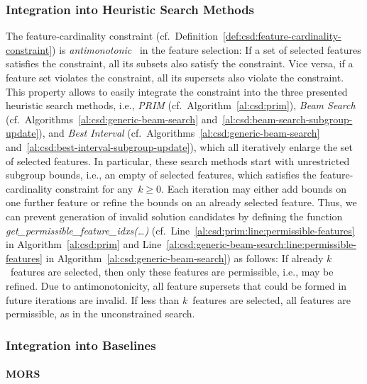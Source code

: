 \documentclass{article}
\theoremstyle{definition}
\begin{document}
\subsubsection{Integration into Heuristic Search Methods}
\label{sec:csd:approach:cardinality:heuristics}

The feature-cardinality constraint (cf.~Definition~\ref{def:csd:feature-cardinality-constraint}) is \emph{antimonotonic}~\cite{ng1998exploratory} in the feature selection:
If a set of selected features satisfies the constraint, all its subsets also satisfy the constraint.
Vice versa, if a feature set violates the constraint, all its supersets also violate the constraint.
This property allows to easily integrate the constraint into the three presented heuristic search methods, i.e., \emph{PRIM} (cf.~Algorithm~\ref{al:csd:prim}), \emph{Beam Search} (cf.~Algorithms~\ref{al:csd:generic-beam-search} and~\ref{al:csd:beam-search-subgroup-update}), and \emph{Best Interval} (cf.~Algorithms~\ref{al:csd:generic-beam-search} and~\ref{al:csd:best-interval-subgroup-update}), which all iteratively enlarge the set of selected features.
In particular, these search methods start with unrestricted subgroup bounds, i.e., an empty of selected features, which satisfies the feature-cardinality constraint for any~$k \geq 0$.
Each iteration may either add bounds on one further feature or refine the bounds on an already selected feature.
Thus, we can prevent generation of invalid solution candidates by defining the function \emph{get\_permissible\_feature\_idxs(\dots)} (cf.~Line~\ref{al:csd:prim:line:permissible-features} in Algorithm~\ref{al:csd:prim} and Line~\ref{al:csd:generic-beam-search:line:permissible-features} in Algorithm~\ref{al:csd:generic-beam-search}) as follows:
If already $k$~features are selected, then only these features are permissible, i.e., may be refined.
Due to antimonotonicity, all feature supersets that could be formed in future iterations are invalid.
If less than $k$~features are selected, all features are permissible, as in the unconstrained search.

\subsubsection{Integration into Baselines}
\label{sec:csd:approach:cardinality:baselines}

\paragraph{MORS}
\end{document}
